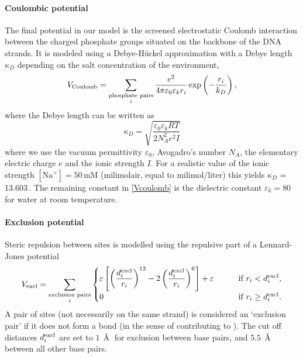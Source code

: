 \paragraph{Coulombic potential}
The final potential in our model is the screened electrostatic Coulomb interaction between the charged phosphate groups situated on the backbone of the DNA strands. It is modeled using a Debye-H\"uckel approximation with a Debye length $\kappa_D$ depending on the salt concentration of the environment,
\begin{equation}
V_\text{Coulomb}
= \sum_{\substack{\text{phosphate pairs}\\i}}
	\frac{e^2}{4 \pi \varepsilon_0 \varepsilon_k r_i}
       		\exp \left(- \frac{r_i}{k_D} \right),
\label{Vcoulomb}
\end{equation}
where the Debye length can be written as
\begin{equation}
\kappa_D
= \sqrt{ \frac{\varepsilon_0 \varepsilon_k RT}{2N^2_A e^2 I}}
\end{equation}
where we use the vacuum permittivity $\varepsilon_0$, Avogadro's number $N_A$, the elementary electric charge $e$ and the ionic strength $I$. For a realistic value of the ionic strength $[\text{Na}^+] = 50$\,mM (milimolair, equal to milimol/liter) this yields $\kappa_D$ = 13.603\,\Angstrom. The remaining constant in \eqref{Vcoulomb} is the dielectric constant $\varepsilon_k = 80$ for water at room temperature.


\paragraph{Exclusion potential}
Steric repulsion between sites is modelled using the repulsive part of a Lennard-Jones potential
\begin{equation}
V_\text{excl}
= \sum_{\substack{\text{exclusion pairs}\\i}}
\begin{cases}
	\varepsilon \left[
		   \left(\dfrac{d^\text{excl}_i}{r_i} \right)^{12}
		- 2\left(\dfrac{d^\text{excl}_i}{r_i} \right)^{6}
       	\right] + \varepsilon
	\qquad &\text{if }r_i < d^\text{excl}_i,\\
	0
	\qquad &\text{if }r_i \geq d^\text{excl}_i.
\end{cases}
\end{equation}
A pair of sites (not necessarily on the same strand) is considered an `exclusion pair' if it does not form a bond (in the sense of contributing to \Vbond).
The cut off distances $d^\text{excl}_i$ are set to $1\,\Angstrom$ for exclusion between base pairs, and $5.5\,\Angstrom$ between all other base pairs.

